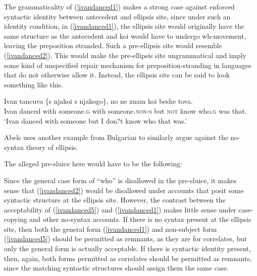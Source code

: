 \documentclass{turabian-researchpaper}
\begin{document}
The grammaticality of (\ref{ivandanced1}) makes a strong case against enforced syntactic identity between antecedent and ellipsis site, since under such an identity condition, in (\ref{ivandanced1}), the ellipsis site would originally have the same structure as the antecedent and koi would have to undergo wh-movement, leaving the preposition stranded. Such a pre-ellipsis site would resemble (\ref{ivandanced2}). This would make the pre-ellipsis site ungrammatical and imply some kind of unspecified repair mechanism for preposition-stranding in languages that do not otherwise allow it. Instead, the ellipsis site can be said to look something like this. 

\begin{exe}
\ex\label{ivandanced3}
\gll Ivan tancuva \{s njakoi \textbar s njakogo\}, no ne znam koi beshe tova. 
 \\ Ivan danced with someone.\textsc{g} with someone.\textsc{non-s} but \textsc{not} know who.\textsc{g} was that. \\
 \trans `Ivan danced with someone but I don?t know who that was.'
\end{exe}

Abels uses another example from Bulgarian to similarly argue against the no-syntax theory of ellipsis. 

\begin{exe}
\end{exe}

\noindent The alleged pre-sluice here would have to be the following: 

\begin{exe}
\end{exe}

Since the general case form of ``who'' is disallowed in the pre-sluice, it makes sense that (\ref{ivandanced2}) would be disallowed under accounts that posit some syntactic structure at the ellipsis site. However, the contrast between the acceptability of (\ref{ivandanced5}) and (\ref{ivandanced1}) makes little sense under case-copying and other no-syntax accounts. If there is no syntax present at the ellipsis site, then both the general form (\ref{ivandanced1}) and non-subject form (\ref{ivandanced5}) should be permitted as remnants, as they are for correlates, but only the general form is actually acceptable. If there is syntactic identity present, then, again, both forms permitted as correlates should be permitted as remnants, since the matching syntactic structures should assign them the same case. 
\end{document}
